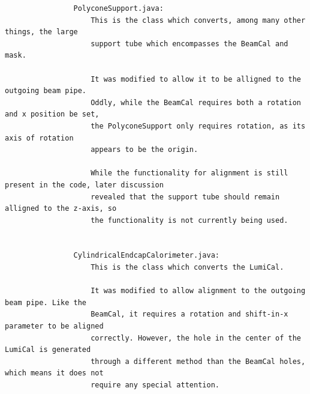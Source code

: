 \documentclass{report}
\begin{document}
\begin{verbatim}
                PolyconeSupport.java:
                    This is the class which converts, among many other things, the large
                    support tube which encompasses the BeamCal and mask.

                    It was modified to allow it to be alligned to the outgoing beam pipe.
                    Oddly, while the BeamCal requires both a rotation and x position be set,
                    the PolyconeSupport only requires rotation, as its axis of rotation
                    appears to be the origin.

                    While the functionality for alignment is still present in the code, later discussion
                    revealed that the support tube should remain alligned to the z-axis, so
                    the functionality is not currently being used.


                CylindricalEndcapCalorimeter.java:
                    This is the class which converts the LumiCal.

                    It was modified to allow alignment to the outgoing beam pipe. Like the
                    BeamCal, it requires a rotation and shift-in-x parameter to be aligned
                    correctly. However, the hole in the center of the LumiCal is generated
                    through a different method than the BeamCal holes, which means it does not
                    require any special attention.
            \end{verbatim}
\end{document}
